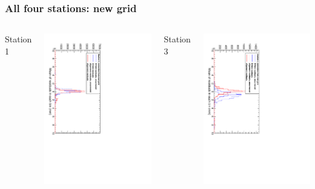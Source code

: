 \documentclass[compress]{beamer}
\begin{document}
\begin{frame}
\frametitle{All four stations: new grid}

\begin{columns}
Station 1

\includegraphics[height=\linewidth, angle=90]{new_grid_station1.pdf}

\vspace{1 cm}
Station 3

\includegraphics[height=\linewidth, angle=90]{new_grid_station3.pdf}


\end{columns}
\end{frame}
\end{document}
